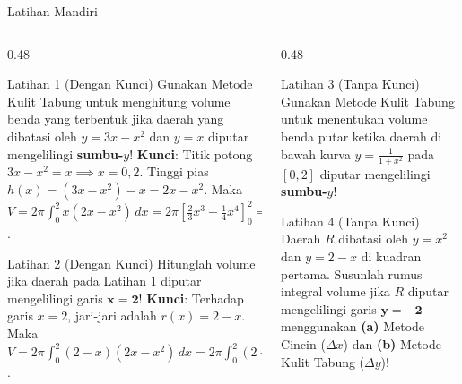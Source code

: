 \documentclass[aspectratio=43,10pt]{beamer}
\begin{document}
\begin{frame}{Latihan Mandiri}
    \begin{columns}[T]
        \begin{column}{0.48\textwidth}
            \begin{exampleblock}{Latihan 1 (Dengan Kunci)}
                \scriptsize
                Gunakan Metode Kulit Tabung untuk menghitung volume benda yang terbentuk jika daerah yang dibatasi oleh $y = 3x - x^2$ dan $y = x$ diputar mengelilingi \textbf{sumbu-$y$}!
                \vskip 2pt
                {\tiny \color{TealCyan} \textbf{Kunci}: Titik potong $3x - x^2 = x \implies x = 0, 2$. Tinggi pias $h(x) = (3x - x^2) - x = 2x - x^2$. Maka $V = 2\pi\int_0^2 x(2x - x^2)\,dx = 2\pi\left[\frac{2}{3}x^3 - \frac{1}{4}x^4\right]_0^2 = \mathbf{\frac{8\pi}{3}}$.}
            \end{exampleblock}

            \begin{exampleblock}{Latihan 2 (Dengan Kunci)}
                \scriptsize
                Hitunglah volume jika daerah pada Latihan 1 diputar mengelilingi garis $\mathbf{x = 2}$!
                \vskip 2pt
                {\tiny \color{TealCyan} \textbf{Kunci}: Terhadap garis $x = 2$, jari-jari adalah $r(x) = 2 - x$. Maka $V = 2\pi\int_0^2 (2 - x)(2x - x^2)\,dx = 2\pi\int_0^2 (2 - x)^2 x\,dx = \mathbf{\frac{8\pi}{3}}$.}
            \end{exampleblock}
        \end{column}

        \begin{column}{0.48\textwidth}
            \begin{block}{Latihan 3 (Tanpa Kunci)}
                \scriptsize
                Gunakan Metode Kulit Tabung untuk menentukan volume benda putar ketika daerah di bawah kurva $y = \frac{1}{1 + x^2}$ pada $[0, 2]$ diputar mengelilingi \textbf{sumbu-$y$}!
            \end{block}

            \begin{block}{Latihan 4 (Tanpa Kunci)}
                \scriptsize
                Daerah $R$ dibatasi oleh $y = x^2$ dan $y = 2 - x$ di kuadran pertama. Susunlah rumus integral volume jika $R$ diputar mengelilingi garis $\mathbf{y = -2}$ menggunakan \textbf{(a)} Metode Cincin ($\Delta x$) dan \textbf{(b)} Metode Kulit Tabung ($\Delta y$)!
            \end{block}
        \end{column}
    \end{columns}
\end{frame}
\end{document}
